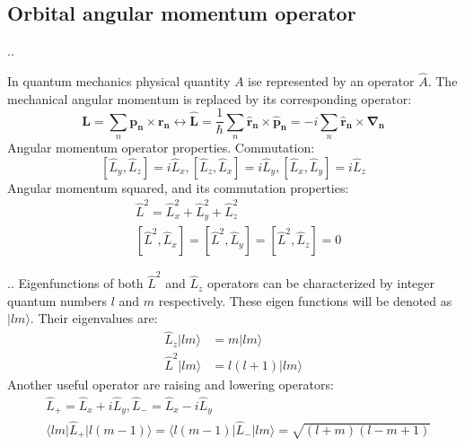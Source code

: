 \documentclass[handout]{beamer}
\begin{document}
\subsection{Orbital angular momentum operator}
\begin{frame}{\thesection.\thesubsection. \insertsubsection}
	
     
     In quantum mechanics physical quantity $A$ ise represented by an operator $\hat{A}$. The mechanical angular momentum is replaced by its corresponding operator:
		\begin{equation}
		\bm{L} = \sum_{n} \bm{p_n} \times \bm{r_n}  \longleftrightarrow \bm{\hat{L}} = \dfrac{1}{\hbar} \sum_{n} \bm{\hat{r}_n} \times \bm{\hat{p}_n} =   -i \sum_{n} \bm{\hat{r}_n} \times \bm{\nabla_n}
		\end{equation}
     Angular momentum operator properties. Commutation:
		\begin{equation}\label{eq:Lz_commutation}
		  [\hat{L}_y,\hat{L}_z] = i\hat{L}_x, [\hat{L}_z,\hat{L}_x] = i\hat{L}_y, [\hat{L}_x,\hat{L}_y] = i\hat{L}_z
    	\end{equation}
     Angular momentum squared, and its commutation properties:
        \begin{align}
          &\hat{L}^2 = \hat{L}_x^2 + \hat{L}_y^2 + \hat{L}_z^2 \\
          &[\hat{L}^2, \hat{L}_x]=[\hat{L}^2, \hat{L}_y]=[\hat{L}^2, \hat{L}_z]= 0       
        \end{align}        


\end{frame}

\begin{frame}{\thesection.\thesubsection. \insertsubsection}
    Eigenfunctions of both $\hat{L}^2$ and $\hat{L}_z$ operators can be characterized by integer quantum numbers $l$  and $m$ respectively. These eigen functions will be denoted as $\vert lm \rangle$. Their eigenvalues are:
		\begin{align}
		\hat{L}_z \vert lm \rangle &= m \vert lm \rangle \\
		\hat{L}^2 \vert lm \rangle &= l(l+1) \vert lm \rangle
		\end{align}
    Another useful operator are raising and lowering operators:
		\begin{align}
		  &\hat{L}_{+} = \hat{L}_x + i\hat{L}_y, \hat{L}_{-} = \hat{L}_x - i\hat{L}_y\\
		  &\langle lm \vert \hat{L}_{+} \vert l (m-1) \rangle = \langle l(m-1) \vert \hat{L}_{-} \vert lm \rangle = \sqrt{(l+m)(l-m+1)} \label{eq:L+}
		\end{align}

	
\end{frame}
\end{document}
